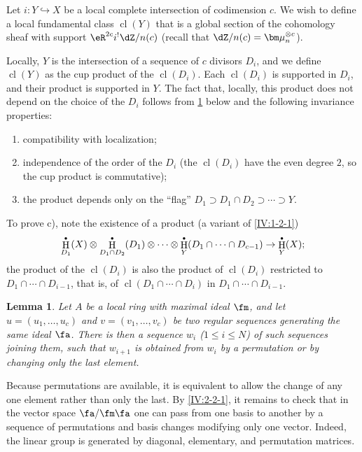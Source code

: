 \documentclass[12pt,oneside,english]{smfbook}
\DeclareMathOperator{\cl}{cl}
\DeclareMathOperator{\h}{H}
\newcommand{\dmu}{{\bm\mu}}
\newtheorem{lemma}[subsubsection]{Lemma}
\let\oldbullet\bullet
\renewcommand{\bullet}{\textnormal{\tiny$\oldbullet$}}
\begin{document}
\subsubsection{}\label{IV:2-2-2}

Let $i:Y\hookrightarrow X$ be a local complete intersection of codimension $c$. We wish to define a local fundamental class $\cl(Y)$ that is a global section of the cohomology sheaf with support $\eR^{2c}i^!\dZ/n(c)$ (recall that $\dZ/n(c)=\dmu_n^{\otimes c}$).

Locally, $Y$ is the intersection of a sequence of $c$ divisors $D_i$, and we define $\cl(Y)$ as the cup product of the $\cl(D_i)$. Each $\cl(D_i)$ is supported in $D_i$, and their product is supported in $Y$. The fact that, locally, this product does not depend on the choice of the $D_i$ follows from \ref{IV:2-2-3} below and the following invariance properties:
\begin{enumerate}[\indent a)]
  \item compatibility with localization;
  \item independence of the order of the $D_i$ (the $\cl(D_i)$ have the even degree $2$, so the cup product is commutative);
  \item the product depends only on the ``flag'' $D_1\supset D_1\cap D_2\supset\cdots\supset Y$.
\end{enumerate}
To prove c), note the existence of a product (a variant of \ref{IV:1-2-1})
\[
  \h_{D_1}^\bullet(X)\otimes \h_{D_1\cap D_2}^\bullet(D_1)\otimes \cdots \otimes \h_Y^\bullet(D_1\cap \cdots \cap D_{c-1}) \to \h_Y^\bullet(X) \text{;}
\]
the product of the $\cl(D_i)$ is also the product of $\cl(D_i)$ restricted to $D_1\cap\cdots\cap D_{i-1}$, that is, of $\cl(D_1\cap\cdots\cap D_i)$ in $D_1\cap\cdots\cap D_{i-1}$.

\begin{lemma}\label{IV:2-2-3}
Let $A$ be a local ring with maximal ideal $\fm$, and let $u=(u_1,\dotsc,u_c)$ and $v=(v_1,\dotsc,v_c)$ be two regular sequences generating the same ideal $\fa$. There is then a sequence $w_i$ ($1\leqslant i\leqslant N$) of such sequences joining them, such that $w_{i+1}$ is obtained from $w_i$ by a permutation or by changing only the last element.
\end{lemma}

Because permutations are available, it is equivalent to allow the change of any one element rather than only the last. By \ref{IV:2-2-1}, it remains to check that in the vector space $\fa/\fm\fa$ one can pass from one basis to another by a sequence of permutations and basis changes modifying only one vector. Indeed, the linear group is generated by diagonal, elementary, and permutation matrices.
\end{document}
